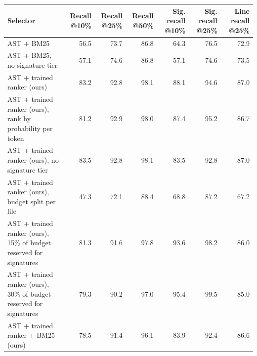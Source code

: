 \begin{tabular}{lrrrrrr}
\toprule
Selector & Recall @10\% & Recall @25\% & Recall @50\% & Sig. recall @10\% & Sig. recall @25\% & Line recall @25\% \\
\midrule
AST + BM25 & 56.5 & 73.7 & 86.8 & 64.3 & 76.5 & 72.9 \\
AST + BM25, no signature tier & 57.1 & 74.6 & 86.8 & 57.1 & 74.6 & 73.5 \\
AST + trained ranker (ours) & 83.2 & 92.8 & 98.1 & 88.1 & 94.6 & 87.0 \\
AST + trained ranker (ours), rank by probability per token & 81.2 & 92.9 & 98.0 & 87.4 & 95.2 & 86.7 \\
AST + trained ranker (ours), no signature tier & 83.5 & 92.8 & 98.1 & 83.5 & 92.8 & 87.0 \\
AST + trained ranker (ours), budget split per file & 47.3 & 72.1 & 88.4 & 68.8 & 87.2 & 67.2 \\
AST + trained ranker (ours), 15\% of budget reserved for signatures & 81.3 & 91.6 & 97.8 & 93.6 & 98.2 & 86.0 \\
AST + trained ranker (ours), 30\% of budget reserved for signatures & 79.3 & 90.2 & 97.0 & 95.4 & 99.5 & 85.0 \\
AST + trained ranker + BM25 (ours) & 78.5 & 91.4 & 96.1 & 83.9 & 92.4 & 86.6 \\
\bottomrule
\end{tabular}
